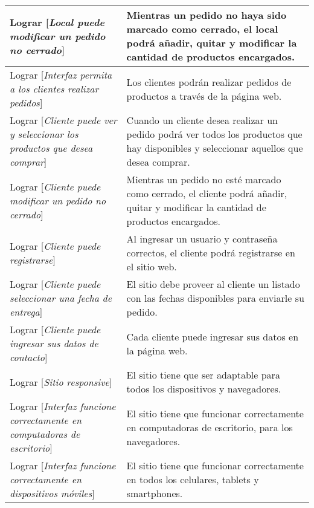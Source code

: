 \begin{center}
\begin{longtable}{p{7cm} p{7cm}}
Lograr [\textit{Local puede modificar un pedido no cerrado}] & Mientras un pedido no haya sido marcado como cerrado, el local podrá añadir, quitar y modificar la cantidad de productos encargados. \\[0.2em] \hline

Lograr [\textit{Interfaz permita a los clientes realizar pedidos}] & Los clientes podrán realizar pedidos de productos a través de la página web. \\[0.2em] \hline

Lograr [\textit{Cliente puede ver y seleccionar los productos que desea comprar}] & Cuando un cliente desea realizar un pedido podrá ver todos los productos que hay disponibles y seleccionar aquellos que desea comprar. \\[0.2em] \hline

Lograr [\textit{Cliente puede modificar un pedido no cerrado}] & Mientras un pedido no esté marcado como cerrado, el cliente podrá añadir, quitar y modificar la cantidad de productos encargados. \\[0.2em] \hline

Lograr [\textit{Cliente puede registrarse}] & Al ingresar un usuario y contraseña correctos, el cliente podrá registrarse en el sitio web. \\[0.2em] \hline

Lograr [\textit{Cliente puede seleccionar una fecha de entrega}] & El sitio debe proveer al cliente un listado con las fechas disponibles para enviarle su pedido. \\[0.2em] \hline

Lograr [\textit{Cliente puede ingresar sus datos de contacto}] & Cada cliente puede ingresar sus datos en la página web. \\[0.2em] \hline

Lograr [\textit{Sitio responsive}] & El sitio tiene que ser adaptable para todos los dispositivos y navegadores. \\[0.2em] \hline

Lograr [\textit{Interfaz funcione correctamente en computadoras de escritorio}] & El sitio tiene que funcionar correctamente en computadoras de escritorio, para los navegadores. \\[0.2em] \hline

Lograr [\textit{Interfaz funcione correctamente en dispositivos móviles}] & El sitio tiene que funcionar correctamente en todos los celulares, tablets y smartphones. \\[0.2em] \hline

\end{longtable}
\end{center}
